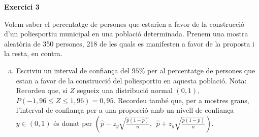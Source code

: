 \begin{enumerate}
 \textbf{Exercici 3}

 Volem saber el percentatge de persones que estarien a favor de la construcció d’un poliesportiu municipal en una població determinada. Prenem una mostra aleatòria de 350 persones, 218 de les quals es manifesten a favor de la proposta i la resta, en contra.
 \begin{enumerate}[a)]
  \item Escriviu un interval de confiança del $95\%$ per al percentatge de persones que estan a favor de la construcció del poliesportiu en aquesta població. Nota: Recordeu que, si $Z$ segueix una distribució normal $(0, 1)$, $P(-1,96 \leq Z \leq 1,96) = 0,95$. Recordeu també que, per a mostres grans, l’interval de confiança per a una proporció amb un nivell de confiança $y \in (0, 1)$ és donat per $\left(\hat{p}-z_y\sqrt{\frac{\hat{p}(1-\hat{p})}{n}}, \ \ \hat{p}+z_y\sqrt{\frac{\hat{p}(1-\hat{p})}{n}}\right)$.
 \end{enumerate}


 \end{enumerate}
\newpage

